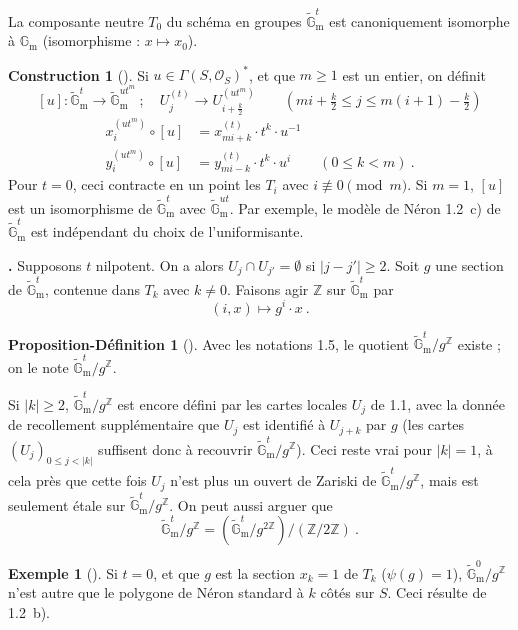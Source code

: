 \documentclass[12pt,a4paper]{amsart}
\theoremstyle{plain}
\theoremstyle{definition}
\newtheorem{proposition-definition}[proposition]{Proposition-D\'efinition}
\newtheorem{construction}[proposition]{Construction}
\newtheorem{exemple}[proposition]{Exemple}
\theoremstyle{remark}
\newcommand{\ZZ}{\mathbb{Z}}
\newcommand{\Gm}{\mathbb{G}_\mathrm{m}}
\newcommand{\Gmtilde}{\widetilde{\mathbb{G}}_\mathrm{m}}
\begin{document}
La composante neutre $T_0$ du sch\'ema en groupes $\Gmtilde^t$ est canoniquement isomorphe \`a $\Gm$ (isomorphisme : $x \mapsto x_0$).

\begin{construction}[\theproposition]
Si $u \in \Gamma(S, \mathcal{O}_S)^*$, et que $m \geq 1$ est un entier, on d\'efinit
\[
[u] : \Gmtilde^t \longrightarrow \Gmtilde^{ut^m} \ ; \quad U_j^{(t)} \longrightarrow U_{i+\frac{k}{2}}^{(ut^m)} \qquad (mi + \tfrac{k}{2} \leq j \leq m(i+1) - \tfrac{k}{2})
\]
\begin{align*}
x_i^{(ut^m)} \circ [u] &= x_{mi+k}^{(t)} \cdot t^k \cdot u^{-1} \\
y_i^{(ut^m)} \circ [u] &= y_{mi-k}^{(t)} \cdot t^k \cdot u^i \qquad (0 \leq k < m) \ .
\end{align*}
Pour $t = 0$, ceci contracte en un point les $T_i$ avec $i \not\equiv 0 \pmod{m}$. Si $m = 1$, $[u]$ est un isomorphisme de $\Gmtilde^t$ avec $\Gmtilde^{ut}$. Par exemple, le mod\`ele de N\'eron 1.2~c) de $\Gmtilde^t$ est ind\'ependant du choix de l'uniformisante.
\end{construction}

\noindent \textbf{\theproposition.} Supposons $t$ nilpotent. On a alors $U_j \cap U_{j'} = \emptyset$ si $|j - j'| \geq 2$. Soit $g$ une section de $\Gmtilde^t$, contenue dans $T_k$ avec $k \neq 0$. Faisons agir $\ZZ$ sur $\Gmtilde^t$ par
\[
(i, x) \mapsto g^i \cdot x \ .
\]

\begin{proposition-definition}[\theproposition]
Avec les notations 1.5, le quotient $\Gmtilde^t / g^{\ZZ}$ existe ; on le note $\Gmtilde^t / g^{\ZZ}$.

Si $|k| \geq 2$, $\Gmtilde^t / g^{\ZZ}$ est encore d\'efini par les cartes locales $U_j$ de 1.1, avec la donn\'ee de recollement suppl\'ementaire que $U_j$ est identifi\'e \`a $U_{j+k}$ par $g$ (les cartes $(U_j)_{0 \leq j < |k|}$ suffisent donc \`a recouvrir $\Gmtilde^t / g^{\ZZ}$). Ceci reste vrai pour $|k| = 1$, \`a cela pr\`es que cette fois $U_j$ n'est plus un ouvert de Zariski de $\Gmtilde^t / g^{\ZZ}$, mais est seulement \'etale sur $\Gmtilde^t / g^{\ZZ}$. On peut aussi arguer que
\[
\Gmtilde^t / g^{\ZZ} = (\Gmtilde^t / g^{2\ZZ}) / (\ZZ/2\ZZ) \ .
\]
\end{proposition-definition}

\begin{exemple}[\theproposition]
Si $t = 0$, et que $g$ est la section $x_k = 1$ de $T_k$ ($\psi(g) = 1$), $\Gmtilde^0 / g^{\ZZ}$ n'est autre que le polygone de N\'eron standard \`a $k$ c\^ot\'es sur $S$. Ceci r\'esulte de 1.2~b).
\end{exemple}
\end{document}
